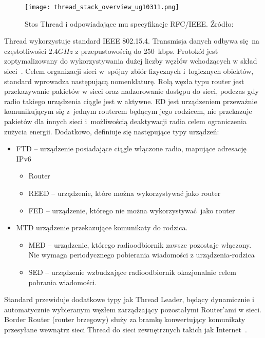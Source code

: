 \begin{figure}[!ht]
	\centering \texttt{[image: thread\_stack\_overview\_ug10311.png]}
	\caption{Stos Thread i odpowiadające mu specyfikacje RFC/IEEE. Źródło:~\cite{silicon_laboratories_ug10311_2022}}
	\label{rys:thread_stack_overview_ug10311}
\end{figure}

Thread wykorzystuje standard IEEE 802.15.4. Transmisja danych odbywa się na częstotliwości $2.4GHz$ z przepustowością
do 250~kbps. Protokół jest zoptymalizowany do wykorzystywania dużej liczby węzłów wchodzących w skład sieci~\cite{silicon_laboratories_ug10311_2022}.
Celem organizacji sieci w~spójny zbiór fizycznych i~logicznych obiektów, standard wprowadza następującą nomenklaturę.
Rolą węzła typu router jest przekazywanie pakietów w sieci oraz nadzorowanie dostępu do sieci, podczas gdy radio
takiego urządzenia ciągle jest w aktywne. \gls{ED} jest urządzeniem przeważnie komunikującym się z~jednym
routerem będącym jego rodzicem, nie przekazuje pakietów dla innych sieci i~możliwością deaktywacji radia
celem ograniczenia zużycia energii. Dodatkowo, definiuje się następujące typy urządzeń:
\begin{itemize}
\item \gls{FTD} -- urządzenie posiadające ciągle włączone radio, mapujące adresację IPv6
	\begin{itemize}
	\item Router
	\item \gls{REED} -- urządzenie, które można wykorzystywać jako router
	\item \gls{FED} -- urządzenie, którego nie można wykorzystywać jako router
	\end{itemize}
\item \gls{MTD} urządzenie przekazujące komunikaty do rodzica.
	\begin{itemize}
	\item \gls{MED} -- urządzenie, którego radioodbiornik zawsze pozostaje włączony. Nie wymaga periodycznego
	pobierania wiadomości z urządzenia-rodzica
	\item \gls{SED} -- urządzenie wzbudzające radioodbiornik okazjonalnie celem pobrania wiadomości.
	\end{itemize}
\end{itemize}
Standard przewiduje dodatkowe typy jak Thread Leader, będący dynamicznie i automatycznie wybieranym węzłem
zarządzający pozostałymi Router'ami w sieci. Border Router (router brzegowy) służy za bramkę
konwertujący komunikaty przesyłane wewnątrz sieci Thread do sieci zewnętrznych takich jak Internet~\cite{noauthor_node_2022}.

